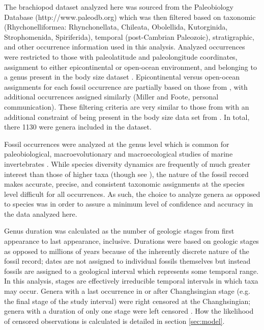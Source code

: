 \documentclass{article}
\begin{document}
The brachiopod dataset analyzed here was sourced from the Paleobiology Database (http://www.paleodb.org) which was then filtered based on taxonomic (Rhychonelliformea: Rhynchonellata, Chileata, Obolellida, Kutorginida, Strophomenida, Spiriferida), temporal (post-Cambrian Paleozoic), stratigraphic, and other occurrence information used in this analysis. Analyzed occurrences were restricted to those with paleolatitude and paleolongitude coordinates, assignment to either epicontinental or open-ocean environment, and belonging to a genus present in the body size dataset \citep{Payne2014}. Epicontinental versus open-ocean assignments for each fossil occurrence are partially based on those from \citet{Miller2009a}, with additional occurrences assigned similarly (Miller and Foote, personal communication). These filtering criteria are very similar to those from \citet{Foote2013} with an additional constraint of being present in the body size data set from \citet{Payne2014}. In total, there 1130 were genera included in the dataset.

Fossil occurrences were analyzed at the genus level which is common for paleobiological, macroevolutionary and macroecological studies of marine invertebrates \citep{Alroy2010,Foote2013,Harnik2013,Kiessling2007a,Miller2009a,Nurnberg2013a,Nurnberg2015,Payne2007,Simpson2009,Vilhena2013}. While species diversity dynamics are frequently of much greater interest than those of higher taxa (though see \citealt{Foote2014b,Hoehn2015}), the nature of the fossil record makes accurate, precise, and consistent taxonomic assignments at the species level difficult for all occurrences. As such, the choice to analyze genera as opposed to species was in order to assure a minimum level of confidence and accuracy in the data analyzed here.

Genus duration was calculated as the number of geologic stages from first appearance to last appearance, inclusive. Durations were based on geologic stages as opposed to millions of years because of the inherently discrete nature of the fossil record; dates are not assigned to individual fossils themselves but instead fossils are assigned to a geological interval which represents some temporal range. In this analysis, stages are effectively irreducible temporal intervals in which taxa may occur. Genera with a last occurrence in or after Changhsingian stage (e.g. the final stage of the study interval) were right censored at the Changhsingian; genera with a duration of only one stage were left censored \citep{Klein2003}. How the likelihood of censored observations is calculated is detailed in section \ref{sec:model}.
\end{document}
